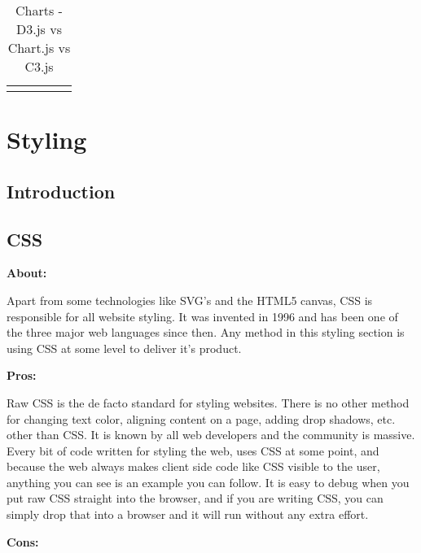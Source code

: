 \documentclass[draftclsnofoot,onecolumn,letterpaper,10pt,compsoc]{IEEEtran}
\begin{document}
  \begin{landscape}
    \begin{table}[]
    \centering
    \caption{Charts - D3.js vs Chart.js vs C3.js}
    \label{my-label}
      \begin{tabular}{lllll}
        &  &  &  & \\
      \end{tabular}
    \end{table}
  \end{landscape}


\section{Styling}

  \subsection{Introduction}
  \subsection{CSS}

    \textbf{About:}

    Apart from some technologies like SVG's and the HTML5 canvas, CSS is responsible for all website styling.
    It was invented in 1996 and has been one of the three major web languages since then.
    Any method in this styling section is using CSS at some level to deliver it's product.\cite{CSSHistory}

    \textbf{Pros:}

    Raw CSS is the de facto standard for styling websites.
    There is no other method for changing text color, aligning content on a page, adding drop shadows, etc. other than CSS.
    It is known by all web developers and the community is massive.
    Every bit of code written for styling the web, uses CSS at some point, and because the web always makes client side code like CSS visible to the user, anything you can see is an example you can follow.
    It is easy to debug when you put raw CSS straight into the browser, and if you are writing CSS, you can simply drop that into a browser and it will run without any extra effort.\cite{CSSProCon}

    \textbf{Cons:}
\end{document}
